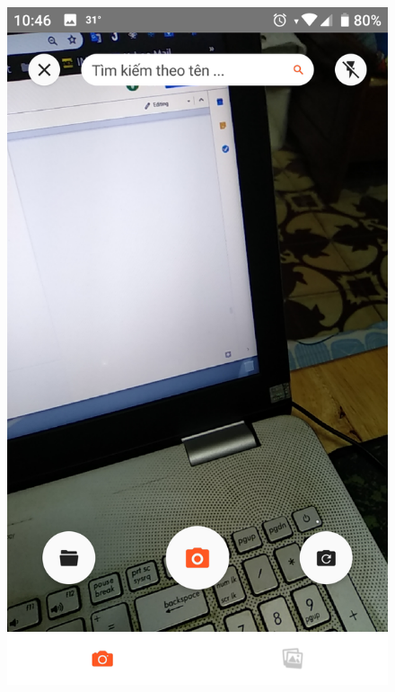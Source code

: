 \documentclass[12pt]{report}
\begin{document}
		\begin{figure}[h]
			\centering
			\includegraphics[scale=0.2]{app_no_flower1}

\end{figure}
\end{document}
